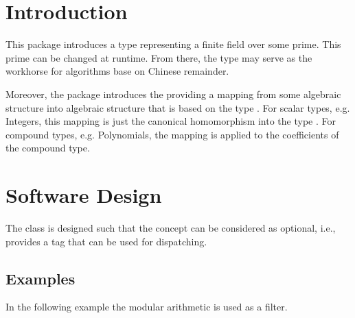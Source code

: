 \cleardoublepage
{}
\label{chap:modular_arithmetic}



\section{Introduction}

This package introduces a type  
representing a finite field over some prime. 
This prime can be changed at runtime. From there, the type may serve
as the workhorse for algorithms base on Chinese remainder.  

Moreover, the package introduces the  
providing a mapping from some algebraic structure  into algebraic 
structure that is based on the type .  
For scalar types, e.g. Integers, this mapping is just the canonical homomorphism
into the type . 
For compound types, e.g. Polynomials, the mapping is applied to the 
coefficients of the compound type. 

\section{Software Design}

The class  is designed such that the concept 
 can be considered as optional, i.e., 
 provides a tag that can be used for dispatching. 

\subsection{Examples}

In the following example the modular arithmetic is used as a filter. 

